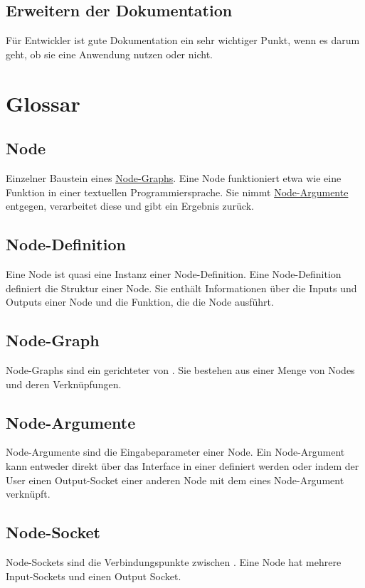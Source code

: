 \documentclass[ngerman]{article}
\begin{document}
\subsection*{Erweitern der Dokumentation}
Für Entwickler ist gute Dokumentation ein sehr wichtiger Punkt, wenn es darum geht, ob sie eine Anwendung nutzen oder nicht. 

\pagebreak
\section{Glossar}

\subsection{Node}
\label{sec:node}
Einzelner Baustein eines \hyperref[sec:node_graph]{Node-Graphs}. Eine Node funktioniert etwa wie eine Funktion in einer textuellen Programmiersprache. Sie nimmt \hyperref[sec:node_argumente]{Node-Argumente} entgegen, verarbeitet diese und gibt ein Ergebnis zurück. 


\subsection{Node-Definition}
\label{sec:node_definition}
Eine Node ist quasi eine Instanz einer Node-Definition. Eine Node-Definition definiert die Struktur einer Node. Sie enthält Informationen über die Inputs und Outputs einer Node und die Funktion, die die Node ausführt.

\subsection{Node-Graph}
\label{sec:node_graph}
Node-Graphs sind ein gerichteter  von . Sie bestehen aus einer Menge von Nodes und deren Verknüpfungen. 

\subsection{Node-Argumente}
\label{sec:node_argumente}
Node-Argumente sind die Eingabeparameter einer Node. Ein Node-Argument kann entweder direkt über das Interface in einer  definiert werden oder indem der User einen Output-Socket einer anderen Node mit dem  eines Node-Argument verknüpft.

\subsection{Node-Socket}
\label{sec:node_socket}
Node-Sockets sind die Verbindungspunkte zwischen . Eine Node hat mehrere Input-Sockets und einen Output Socket.
\end{document}
